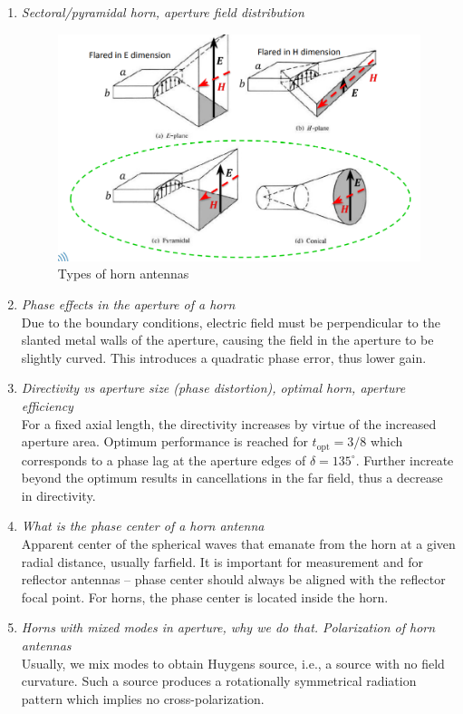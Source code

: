 \documentclass[11pt,a4paper]{article}
\begin{document}
\begin{enumerate}
    \item \emph{Sectoral/pyramidal horn, aperture field distribution}
    \begin{figure}[!ht]
        \centering
        \includegraphics[width=.7\textwidth]{src/horn-antennas-types.png}
        \caption{\label{fig:horn-antennas-types}Types of horn antennas}
    \end{figure}
    
    \item \emph{Phase effects in the aperture of a horn}\\
    Due to the boundary conditions, electric field must be perpendicular to the slanted metal walls of the aperture, causing the field in the aperture to be slightly curved. This introduces a quadratic phase error, thus lower gain.

    \item \emph{Directivity vs aperture size (phase distortion), optimal horn, aperture efficiency}\\
    For a fixed axial length, the directivity increases by virtue of the increased aperture area. Optimum performance is reached for $t_{\mathrm{opt}} = 3/8$ which corresponds to a phase lag at the aperture edges of $\delta = 135^\circ$. Further increate beyond the optimum results in cancellations in the far field, thus a decrease in directivity.
    
    \item \emph{What is the phase center of a horn antenna}\\
    Apparent center of the spherical waves that emanate from the horn at a given radial distance, usually farfield. It is important for measurement and for reflector antennas -- phase center should always be aligned with the reflector focal point. For horns, the phase center is located inside the horn.
    
    \item \emph{Horns with mixed modes in aperture, why we do that. Polarization of horn antennas}\\
    Usually, we mix modes to obtain Huygens source, i.e., a source with no field curvature. Such a source produces a rotationally symmetrical radiation pattern which implies no cross-polarization.
    

\end{enumerate}
\end{document}
